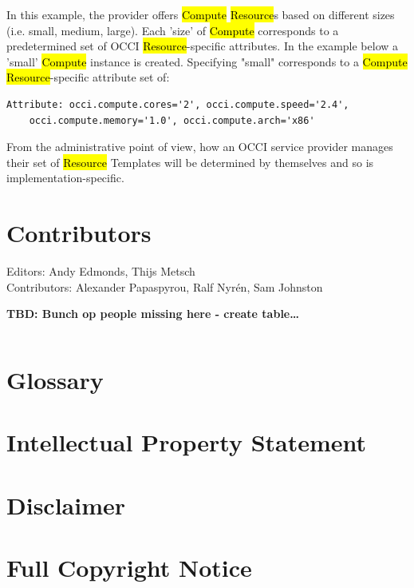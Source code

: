\documentclass[10pt,a4paper]{article}
\begin{document}
In this example, the provider offers \hl{Compute} \hl{Resource}s based on different sizes (i.e. small,
medium, large). Each 'size' of \hl{Compute} corresponds to a predetermined set of OCCI 
\hl{Resource}-specific attributes. In the example below a 'small' \hl{Compute} instance is created. 
Specifying "small" corresponds to a \hl{Compute} \hl{Resource}-specific attribute set of:

\begin{verbatim}
Attribute: occi.compute.cores='2', occi.compute.speed='2.4', 
    occi.compute.memory='1.0', occi.compute.arch='x86'
\end{verbatim}

From the administrative point of view, how an OCCI service provider manages their set of 
\hl{Resource} Templates will be determined by themselves and so is implementation-specific.


\section{Contributors}

Editors: Andy Edmonds, Thijs Metsch \\
Contributors: Alexander Papaspyrou, Ralf Nyr\'en, Sam Johnston

\textbf{TBD: Bunch op people missing here - create table\ldots}

\begin{verbatim}

\end{verbatim}

\section{Glossary}


\section{Intellectual Property Statement}


\section{Disclaimer}


\section{Full Copyright Notice}




\end{document}
